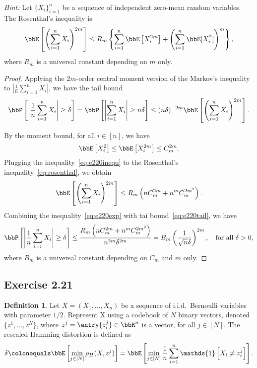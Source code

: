 \documentclass[11pt]{article}
\newcommand{\of}[1]{\left(#1\right)}
\newcommand{\off}[1]{\left[#1\right]}
\newcommand{\offf}[1]{\left\{#1\right\}}
\newcommand{\aabs}[1]{\left|#1\right|}
\theoremstyle{plain}
\theoremstyle{definition}
\newtheorem{defn}{Definition}
\begin{document}
\textit{Hint:} Let $\{X_i\}_{i=1}^n$ be a sequence of independent zero-mean random variables. The Rosenthal’s inequality is
\begin{equation}\label{eq:rosenthal}
	\bbE \off{\of{\sum_{i=1}^n X_i}^{2m}} \leq R_m \offf{\sum_{i=1}^n \bbE \off{X^{2m}_i} + \of{\sum_{i=1}^n \bbE [X^2_i]}^m },
\end{equation}
 where $R_m$ is a universal constant depending on $m$ only.
 
 \begin{proof}
 	Applying the $2m$-order central moment version of the Markov's inequality to $\aabs{ \frac{1}{n}  \sum_{i=1}^n X_i } $, we have the tail bound
 	\begin{equation}\label{eq:e220tail}
 		\bbP \off{\aabs{ \frac{1}{n}  \sum_{i=1}^n X_i } \geq \delta } = \bbP \off{\aabs{  \sum_{i=1}^n X_i } \geq n \delta } \leq (n\delta)^{-2m} \bbE \off{ \of{\sum_{i=1}^n X_i}^{2m} }.
 	\end{equation}
 	
 	By the moment bound, for all $i\in [n]$, we have
 	\begin{equation}\label{eq:e220inequ}
 		\bbE \off{X^2_i}  \leq \bbE \off{X^{2m}_i} \leq C^{2m}_m.
 	\end{equation}
 	Plugging the inequality~\eqref{eq:e220inequ} to the Rosenthal's inequality~\eqref{eq:rosenthal}, we obtain
 	\begin{equation}\label{eq:e220exp}
 		\bbE \off{\of{\sum_{i=1}^n X_i}^{2m}} \leq R_m\of{nC^{2m}_m  + n^m C^{2m^2}_m  }. 
 	\end{equation}
 	Combining the inequality~\eqref{eq:e220exp} with tai bound~\eqref{eq:e220tail}, we have
 	\begin{equation}
 		\bbP \off{\aabs{ \frac{1}{n}  \sum_{i=1}^n X_i } \geq \delta } \leq \frac{R_m\of{nC^{2m}_m  + n^m C^{2m^2}_m  } }{n^{2m} \delta^{2m}} = B_m\of{ \frac{1}{\sqrt{n} \delta}}^{2m}, \quad \text{for all }\delta > 0,
 	\end{equation}
 	where $B_m$ is a universal constant depending on $C_m$ and $m$ only.
 \end{proof}
 
 \subsection{Exercise 2.21}
 \begin{defn}
 	Let $X=(X_1,...,X_n)$ be a sequence of i.i.d.\ Bernoulli variables with parameter $1/2$. Represent X using a codebook of $N$ binary vectors, denoted $\{z^1,...,z^N\}$, where $z^j = \entry{z^j_i} \in \bbR^n$ is a vector, for all $j \in [N]$. The rescaled Hamming distortion is defined as
 	\begin{equation}
 		\delta \colonequals \bbE \off{ \min_{j \in [N]} \rho_H(X, z^j) } = \bbE \off{ \min_{j \in [N]} \frac{1}{n} \sum_{i = 1}^n  \mathds{1} \off{X_i \neq z^j_i} }. 
 	\end{equation}
 \end{defn}
 
\end{document}
